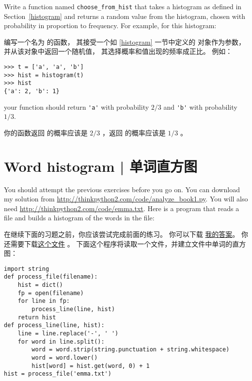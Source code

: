 \begin{exercise}

Write a function named \verb"choose_from_hist" that takes
a histogram as defined in Section~\ref{histogram} and returns a
random value from the histogram, chosen with probability
in proportion to frequency.  For example, for this histogram:

编写一个名为  的函数， 其接受一个如 \ref{histogram} 一节中定义的  对象作为参数， 并从该对象中返回一个随机值， 其选择概率和值出现的频率成正比。 例如：

\begin{lstlisting}
>>> t = ['a', 'a', 'b']
>>> hist = histogram(t)
>>> hist
{'a': 2, 'b': 1}
\end{lstlisting}

%
your function should return \verb"'a'" with probability $2/3$ and \verb"'b'"
with probability $1/3$.

你的函数返回  的概率应该是 $2/3$ ，返回  的概率应该是 $1/3$ 。

\end{exercise}

\section{Word histogram  |  单词直方图}

You should attempt the previous exercises before you go on.
You can download my solution from
 \url{http://thinkpython2.com/code/analyze_book1.py}.  You will
also need \url{http://thinkpython2.com/code/emma.txt}.
Here is a program that reads a file and builds a histogram of the
words in the file:

在继续下面的习题之前，你应该尝试完成前面的练习。
你可以下载 \href{http://thinkpython2.com/code/analyze_book1.py}{我的答案}。
你还需要下载\href{http://thinkpython2.com/code/emma.txt}{这个文件} 。
下面这个程序将读取一个文件，并建立文件中单词的直方图：


\begin{lstlisting}
import string
def process_file(filename):
    hist = dict()
    fp = open(filename)
    for line in fp:
        process_line(line, hist)
    return hist
def process_line(line, hist):
    line = line.replace('-', ' ')
    for word in line.split():
        word = word.strip(string.punctuation + string.whitespace)
        word = word.lower()
        hist[word] = hist.get(word, 0) + 1
hist = process_file('emma.txt')
\end{lstlisting}

